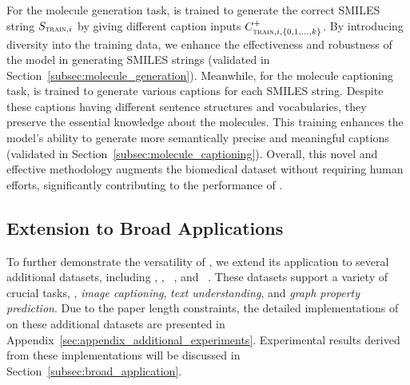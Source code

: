 For the molecule generation task, \newmodel is trained to generate the correct SMILES string $S_{\textsc{train}, i}$ by giving different caption inputs $C^+_{\textsc{train}, i, \{0, 1, \dots, k \}}$. 
By introducing diversity into the training data, we enhance the effectiveness and robustness of the model in generating SMILES strings (validated in Section~\ref{subsec:molecule_generation}). 
% 
Meanwhile, for the molecule captioning task, \newmodel is trained to generate various captions for each SMILES string. 
Despite these captions having different sentence structures and vocabularies, they preserve the essential knowledge about the molecules.
This training enhances the model’s ability to generate more semantically precise and meaningful captions (validated in Section~\ref{subsec:molecule_captioning}). 
% 
Overall, this novel and effective methodology augments the biomedical dataset without requiring human efforts, significantly contributing to the performance of \newmodel.

\subsection{Extension to Broad Applications}
\label{subsec:extension_broad_application}
To further demonstrate the versatility of \pipeline, we extend its application to several additional datasets, including \bace, \hiv, \esol~\cite{HFZDRLCL20}, and \image~\cite{SDGS18}. 
These datasets support a variety of crucial tasks, \eg, \emph{image captioning}, \emph{text understanding}, and \emph{graph property prediction}.
% 
Due to the paper length constraints, the detailed implementations of \newmodel on these additional datasets are presented in Appendix~\ref{sec:appendix_additional_experiments}. 
Experimental results derived from these implementations will be discussed in Section~\ref{subsec:broad_application}. 
